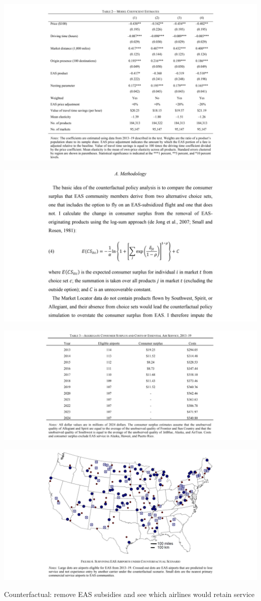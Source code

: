 \documentclass[aspectratio=169]{beamer}
\begin{document}
\begin{frame}
\centering
\includegraphics[width=.9\textwidth]{EASestimates.jpg}
\end{frame}

\begin{frame}
\centering
\includegraphics[width=.9\textwidth]{EASconsumersurplus.jpg}
\end{frame}

\begin{frame}
\centering
\includegraphics[width=.9\textwidth]{EAStable3.jpg}
\end{frame}


\begin{frame}
\centering
\includegraphics[width=.9\textwidth]{EASfig6.jpg}

\bigskip{}

Counterfactual: remove EAS subsidies and see which airlines would retain service
\end{frame}
\end{document}
